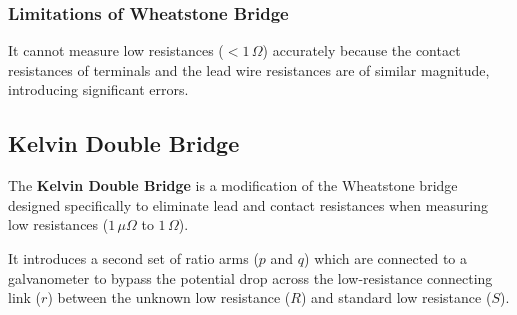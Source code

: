 \documentclass[12pt,a4paper]{article}
\begin{document}
\subsubsection{Limitations of Wheatstone Bridge}
It cannot measure low resistances ($< 1\,\Omega$) accurately because the contact resistances of terminals and the lead wire resistances are of similar magnitude, introducing significant errors.

\subsection{Kelvin Double Bridge}
The \textbf{Kelvin Double Bridge} is a modification of the Wheatstone bridge designed specifically to eliminate lead and contact resistances when measuring low resistances ($1\,\mu\Omega$ to $1\,\Omega$).

\begin{tcolorbox}[defbox, title={\textbf{Kelvin Double Bridge Concept}}]
It introduces a second set of ratio arms ($p$ and $q$) which are connected to a galvanometer to bypass the potential drop across the low-resistance connecting link ($r$) between the unknown low resistance ($R$) and standard low resistance ($S$).
\end{tcolorbox}
\end{document}
